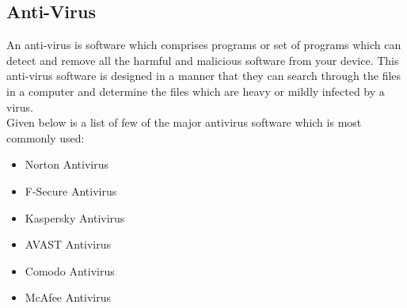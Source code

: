 \documentclass[11pt,a4paper,twoside]{article}
\begin{document}
\subsection{Anti-Virus}
An anti-virus is software which comprises programs or set of programs which can detect and remove all the harmful and malicious software from your device. This anti-virus software is designed in a manner that they can search through the files in a computer and determine the files which are heavy or mildly infected by a virus.\\
Given below is a list of few of the major antivirus software which is most commonly used:
\begin{itemize}
\item Norton Antivirus
\item F-Secure Antivirus
\item Kaspersky Antivirus
\item AVAST Antivirus
\item Comodo Antivirus
\item McAfee Antivirus
\end{itemize}
\end{document}
